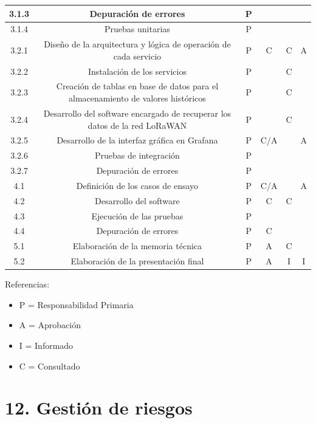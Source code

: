 \documentclass[11pt]{charter}
\begin{document}
\begin{table}[H]
{\begin{tabular}{|c|c|c|c|c|c|}
 3.1.3& Depuración de errores & P &  &  &  \\ \hline
 3.1.4& Pruebas unitarias & P &  &  &  \\ \hline
 3.2.1& Diseño de la arquitectura y lógica de operación de cada servicio & P & C & C & A \\ \hline
 3.2.2& Instalación de los servicios & P &  & C &  \\ \hline
 3.2.3& Creación de tablas en base de datos para el almacenamiento de valores históricos & P &  & C &  \\ \hline
 3.2.4& Desarrollo del software encargado de recuperar los datos de la red LoRaWAN & P &  & C &  \\ \hline
 3.2.5& Desarrollo de la interfaz gráfica en Grafana & P & C/A &  & A \\ \hline
 3.2.6& Pruebas de integración & P &  &  &  \\ \hline
 3.2.7& Depuración de errores & P &  &  &  \\ \hline
 4.1& Definición de los casos de ensayo & P & C/A &  & A \\ \hline
 4.2& Desarrollo del software & P & C & C &  \\ \hline
 4.3& Ejecución de las pruebas & P &  &  &  \\ \hline
 4.4& Depuración de errores & P & C &  &  \\ \hline
 5.1& Elaboración de la memoria técnica & P & A & C &  \\ \hline
 5.2& Elaboración de la presentación final & P & A & I & I \\ \hline
\end{tabular}%
}
\end{table}

{\footnotesize
Referencias:
\begin{itemize}
	\item P = Responsabilidad Primaria
	\item A = Aprobación
	\item I = Informado
	\item C = Consultado
\end{itemize}
} %


\section{12. Gestión de riesgos}
\label{sec:riesgos}
\end{document}
